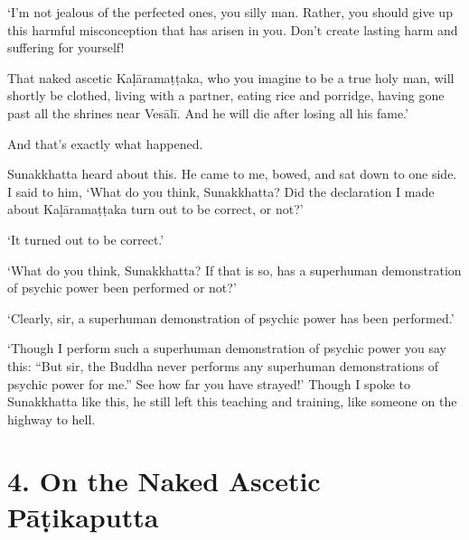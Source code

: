 \documentclass[12pt,openany]{book}%
\begin{document}
‘I’m not jealous of the perfected ones, you silly man. Rather, you should give up this harmful misconception that has arisen in you. Don’t create lasting harm and suffering for yourself! 

That naked ascetic \textsanskrit{Kaḷāramaṭṭaka}, who you imagine to be a true holy man, will shortly be clothed, living with a partner, eating rice and porridge, having gone past all the shrines near \textsanskrit{Vesālī}. And he will die after losing all his fame.’ 

And that’s exactly what happened. 

Sunakkhatta heard about this. He came to me, bowed, and sat down to one side. I said to him, ‘What do you think, Sunakkhatta? Did the declaration I made about \textsanskrit{Kaḷāramaṭṭaka} turn out to be correct, or not?’ 

‘It turned out to be correct.’ 

‘What do you think, Sunakkhatta? If that is so, has a superhuman demonstration of psychic power been performed or not?’ 

‘Clearly, sir, a superhuman demonstration of psychic power has been performed.’ 

‘Though I perform such a superhuman demonstration of psychic power you say this: “But sir, the Buddha never performs any superhuman demonstrations of psychic power for me.” See how far you have strayed!’ Though I spoke to Sunakkhatta like this, he still left this teaching and training, like someone on the highway to hell. 

\section*{4. On the Naked Ascetic \textsanskrit{Pāṭikaputta} }
\end{document}
